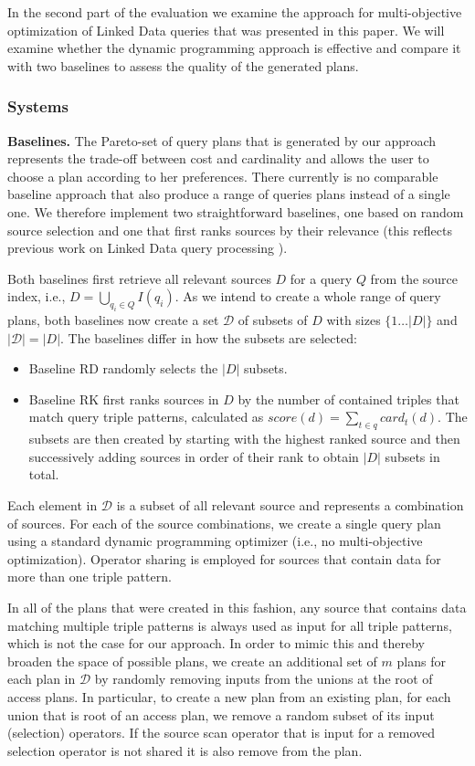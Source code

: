 In the second part of the evaluation we examine the approach for
multi-objective optimization of Linked Data queries that was presented
in this paper. We will examine whether the dynamic programming
approach is effective and compare it with two baselines to assess the
quality of the generated plans.

\subsubsection{Systems}

\textbf{Baselines.} The Pareto-set of query plans that is generated by
our approach represents the trade-off between cost and cardinality and
allows the user to choose a plan according to her preferences. There
currently is no comparable baseline approach that also produce a range
of queries plans instead of a single one. We therefore implement two
straightforward baselines, one based on random source selection and
one that first ranks sources by their relevance (this reflects
previous work on Linked Data query processing
\cite{harth_data_2010,ladwig_linked_2010}).

Both baselines first retrieve all relevant sources $D$ for a query $Q$
from the source index, i.e., $D = \bigcup_{q_i \in Q} I(q_i)$. As we
intend to create a whole range of query plans, both baselines now
create a set $\mathcal{D}$ of subsets of $D$ with sizes $\{1\ldots
|D|\}$ and $|\mathcal{D}| = |D|$. The baselines differ in how the
subsets are selected:
\begin{itemize}
\item Baseline RD randomly selects the $|D|$ subsets.
\item Baseline RK first ranks sources in $D$ by the number of
  contained triples that match query triple patterns, calculated as
  $score(d) = \sum_{t \in q} card_t(d)$. The subsets are then created
  by starting with the highest ranked source and then successively
  adding sources in order of their rank to obtain $|D|$ subsets in
  total.
\end{itemize}
Each element in $\mathcal{D}$ is a subset of all relevant source and
represents a combination of sources. For each of the source
combinations, we create a single query plan using a standard dynamic
programming optimizer (i.e., no multi-objective
optimization). Operator sharing is employed for sources that contain
data for more than one triple pattern.

In all of the plans that were created in this fashion, any source that
contains data matching multiple triple patterns is always used as
input for all triple patterns, which is not the case for our
approach. In order to mimic this and thereby broaden the space of
possible plans, we create an additional set of $m$ plans for each plan
in $\mathcal{D}$ by randomly removing inputs from the unions at the
root of access plans. In particular, to create a new plan from an
existing plan, for each union that is root of an access plan, we
remove a random subset of its input (selection) operators. If the
source scan operator that is input for a removed selection operator is
not shared it is also remove from the plan.

